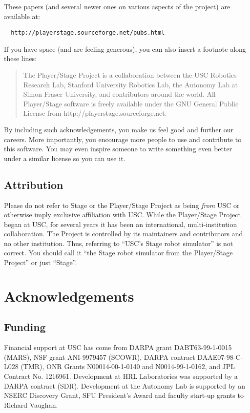 \documentclass[letter,11pt,twoside]{report}
\begin{document}
These papers (and several newer ones on various aspects of the
project) are available at:

\begin{verbatim}
  http://playerstage.sourceforge.net/pubs.html
\end{verbatim}

If you have space (and are feeling generous), you can also insert a footnote
along these lines:
\begin{quote}
  The Player/Stage Project is a collaboration between the USC Robotics
  Research Lab, Stanford University Robotics Lab, the Autonomy Lab at
  Simon Fraser University, and contributors around the world. All
  Player/Stage software is freely available under the GNU General
  Public License from http://playerstage.sourceforge.net.
\end{quote}
By including such acknowledgements, you make us feel good and further
our careers. More importantly, you encourage more people to use and
contribute to this software. You may even inspire someone to write
something even better under a similar license so you can use it.

\subsection{Attribution}

Please do not refer to Stage or the Player/Stage Project as being {\em
  from} USC or otherwise imply exclusive affiliation with USC. While
  the Player/Stage Project began at USC, for several years it has been
  an international, multi-institution collaboration. The Project is
  controlled by its maintainers and contributors and no other
  institution. Thus, referring to ``USC's Stage robot simulator'' is
  not correct. You should call it ``the Stage robot simulator from the
  Player/Stage Project'' or just ``Stage''. 

\section{Acknowledgements}

\subsection{Funding}
Financial support at USC has come from DARPA grant DABT63-99-1-0015
(MARS), NSF grant ANI-9979457 (SCOWR), DARPA contract DAAE07-98-C-L028
(TMR), ONR Grants N00014-00-1-0140 and N0014-99-1-0162, and JPL
Contract No. 1216961. Development at HRL Laboratories was supported by
a DARPA contract (SDR). Development at the Autonomy Lab is supported by
an NSERC Discovery Grant, SFU President's Award and faculty start-up
grants to Richard Vaughan.
\end{document}
